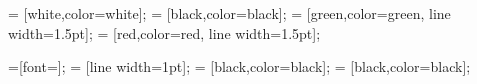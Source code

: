 %

\providecommand{\raceConfigurations}{$\Theta$}

 = [white,color=white];
 = [black,color=black];
 = [green,color=green, line width=1.5pt];
 = [red,color=red, line width=1.5pt];

=[font=\normalsize];
 = [line width=1pt];
 = [black,color=black];
 = [black,color=black];

